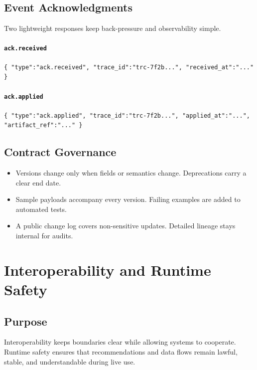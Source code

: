 \documentclass[12pt]{article}
\begin{document}
\subsection*{Event Acknowledgments}
Two lightweight responses keep back-pressure and observability simple.

\paragraph{\texttt{ack.received}}
\begin{verbatim}
{ "type":"ack.received", "trace_id":"trc-7f2b...", "received_at":"..." }
\end{verbatim}

\paragraph{\texttt{ack.applied}}
\begin{verbatim}
{ "type":"ack.applied", "trace_id":"trc-7f2b...", "applied_at":"...", "artifact_ref":"..." }
\end{verbatim}

\subsection*{Contract Governance}
\begin{itemize}[leftmargin=*]
  \item Versions change only when fields or semantics change. Deprecations carry a clear end date.
  \item Sample payloads accompany every version. Failing examples are added to automated tests.
  \item A public change log covers non-sensitive updates. Detailed lineage stays internal for audits.
\end{itemize}


\section{Interoperability and Runtime Safety}

\subsection*{Purpose}
Interoperability keeps boundaries clear while allowing systems to cooperate. Runtime safety ensures that recommendations and data flows remain lawful, stable, and understandable during live use.
\end{document}
